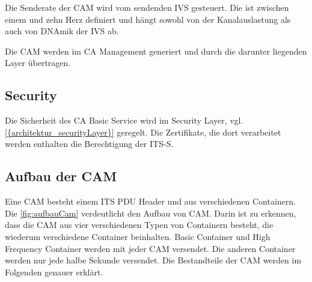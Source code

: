 Die Senderate der \ac{CAM} wird vom sendenden \ac{IVS} gesteuert. Die ist zwischen einem und zehn Herz definiert und hängt sowohl von der Kanalauslastung als auch von DNAmik der \ac{IVS} ab. 

Die \ac{CAM} werden im \ac{CA} Management generiert und durch die darunter liegenden Layer übertragen.

\subsection{Security}
Die Sicherheit des \ac{CA} Basic Service wird im Security Layer, vgl. \autoref{{architektur_securityLayer}} geregelt. Die Zertifikate, die dort verarbeitet werden enthalten die Berechtigung der \ac{ITS-S}. 
 
\subsection{Aufbau der CAM}
Eine \ac{CAM} besteht einem \ac{ITS} \ac{PDU} Header und aus verschiedenen Containern. Die \autoref{fig:aufbauCam} verdeutlicht den Aufbau von \ac{CAM}. Darin ist zu erkennen, dass die \ac{CAM} aus vier verschiedenen Typen von Containern besteht, die wiederum verschiedene Container beinhalten. Basic Container und High Frequency Container werden mit jeder \ac{CAM} versendet. Die anderen Container werden nur jede halbe Sekunde versendet. Die Bestandteile der \ac{CAM} werden im Folgenden genauer erklärt.

